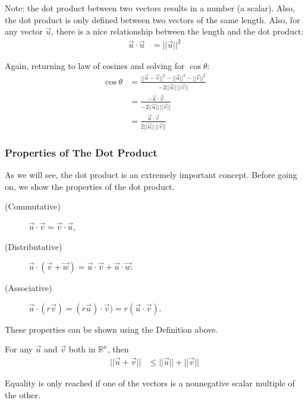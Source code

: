Note:  the dot product between two vectors results in a number (a scalar).  Also, the dot product is only defined between two vectors of the same length.  Also, for any vector $\vec{u}$, there is a nice relationship between the length and the dot product:
%
\begin{align*}
\vec{u} \cdot \vec{u}  & = ||\vec{u}||^2
\end{align*}

Again, returning to law of cosines and solving for $\cos \theta$:
%
\begin{align*}
\cos \theta & = \frac{||\vec{u}-\vec{v}||^2-||\vec{u}||^2-||\vec{v}||^2}{-2 ||\vec{u}|| \, ||\vec{v}||} \\
& = \frac{-\vec{u} \cdot \vec{v}}{-2 ||\vec{u}|| \, ||\vec{v}||} \\
& = \frac{\vec{u} \cdot \vec{v}}{2 ||\vec{u}|| \, ||\vec{v}||}
\end{align*}

\subsubsection{Properties of The Dot Product} \label{sect:dot:prod:props}

As we will see, the dot product is an extremely important concept.  Before going on, we show the properties of the dot product.

\begin{description}
\item[(Commutative)]   $\vec{u} \cdot \vec{v} = \vec{v} \cdot \vec{u}$,
\item[(Distributative)] $\vec{u} \cdot (\vec{v} + \vec{w}) = \vec{u} \cdot \vec{v} + \vec{u} \cdot \vec{w}$.
\item[(Associative)] $\vec{u} \cdot (r\vec{v}) = (r \vec{u}) \cdot \vec{v}) = r (\vec{u} \cdot \vec{v})$.
\end{description}

These properties can be shown using the Definition above.



\begin{theorem}
For any $\vec{u}$ and $\vec{v}$ both in $\mathbb{R}^n$, then
%
\begin{align*}
||\vec{u}+\vec{v}|| &  \leq ||\vec{u}||+||\vec{v}||
\end{align*}

Equality is only reached if one of the vectors is a nonnegative scalar multiple of the other.
\end{theorem}

